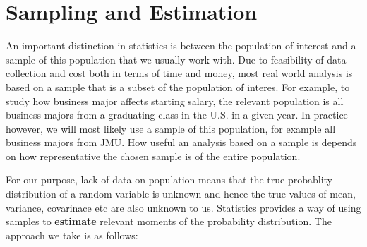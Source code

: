 \documentclass[]{book}
\theoremstyle{definition}
\theoremstyle{definition}
\theoremstyle{definition}
\theoremstyle{remark}
\begin{document}
\hypertarget{sampling-and-estimation}{%
\section{Sampling and Estimation}\label{sampling-and-estimation}}

An important distinction in statistics is between the population of interest and a sample of this population that we usually work with. Due to feasibility of data collection and cost both in terms of time and money, most real world analysis is based on a sample that is a subset of the population of interes. For example, to study how business major affects starting salary, the relevant population is all business majors from a graduating class in the U.S. in a given year. In practice however, we will most likely use a sample of this population, for example all business majors from JMU. How useful an analysis based on a sample is depends on how representative the chosen sample is of the entire population.

For our purpose, lack of data on population means that the true probablity distribution of a random variable is unknown and hence the true values of mean, variance, covarinace etc are also unknown to us. Statistics provides a way of using samples to \textbf{estimate} relevant moments of the probability distribution. The approach we take is as follows:
\end{document}
